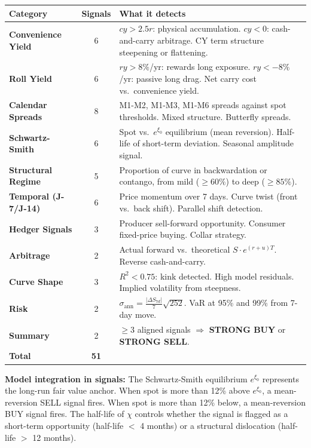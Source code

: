 \documentclass[11pt,a4paper]{article}
\newenvironment{notebox}{%
  \begin{tcolorbox}[
    colback=notebg, colframe=noteborder,
    left=8pt, right=8pt, top=5pt, bottom=5pt, boxrule=0.5pt
  ]
}{\end{tcolorbox}}
\begin{document}
\begin{center}
\begin{tabularx}{\textwidth}{>{\bfseries}l c X}
\toprule
Category & Signals & What it detects \\
\midrule
Convenience Yield   & 6 & $cy > 2.5r$: physical accumulation. $cy < 0$: cash-and-carry arbitrage. CY term structure steepening or flattening. \\
Roll Yield          & 6 & $ry > 8\%$/yr: rewards long exposure. $ry < -8\%$/yr: passive long drag. Net carry cost vs.\ convenience yield. \\
Calendar Spreads    & 8 & M1-M2, M1-M3, M1-M6 spreads against spot thresholds. Mixed structure. Butterfly spreads. \\
Schwartz-Smith      & 6 & Spot vs.\ $e^{\xi_0}$ equilibrium (mean reversion). Half-life of short-term deviation. Seasonal amplitude signal. \\
Structural Regime   & 5 & Proportion of curve in backwardation or contango, from mild ($\geq 60\%$) to deep ($\geq 85\%$). \\
Temporal (J-7/J-14) & 6 & Price momentum over 7 days. Curve twist (front vs.\ back shift). Parallel shift detection. \\
Hedger Signals      & 3 & Producer sell-forward opportunity. Consumer fixed-price buying. Collar strategy. \\
Arbitrage           & 2 & Actual forward vs.\ theoretical $S \cdot e^{(r+u)T}$. Reverse cash-and-carry. \\
Curve Shape         & 3 & $R^2 < 0.75$: kink detected. High model residuals. Implied volatility from steepness. \\
Risk                & 2 & $\sigma_{\text{ann}} = \frac{|\Delta S_{7d}|}{7}\sqrt{252}$. VaR at 95\% and 99\% from 7-day move. \\
Summary             & 2 & $\geq 3$ aligned signals $\Rightarrow$ \textcolor{signalgreen}{\textbf{STRONG BUY}} or \textcolor{signalred}{\textbf{STRONG SELL}}. \\
\midrule
\textbf{Total} & \textbf{51} & \\
\bottomrule
\end{tabularx}
\end{center}

\begin{notebox}
\textbf{Model integration in signals:} The Schwartz-Smith equilibrium $e^{\xi_0}$ represents the long-run fair value anchor. When spot is more than 12\% above $e^{\xi_0}$, a mean-reversion SELL signal fires. When spot is more than 12\% below, a mean-reversion BUY signal fires. The half-life of $\chi$ controls whether the signal is flagged as a short-term opportunity (half-life $<$ 4 months) or a structural dislocation (half-life $>$ 12 months).
\end{notebox}
\end{document}
